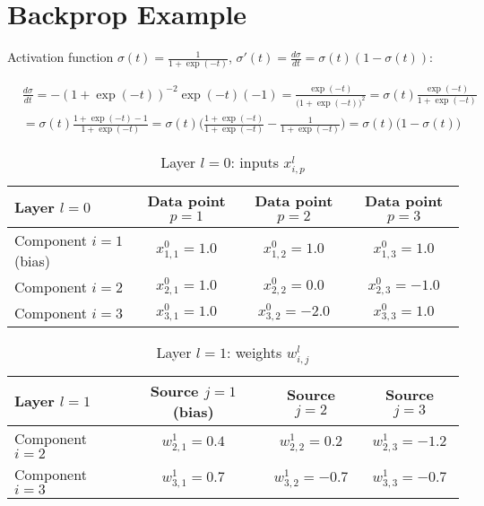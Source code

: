 \section{Backprop Example}
\label{appendix:backprop-example}

Activation function $\sigma(t) = \frac{1}{1 + \exp(-t)}$, $\sigma'(t) = \frac{d \sigma}{dt} = \sigma(t) (1 - \sigma(t))$:

\begin{equation}
\begin{split}
    & \frac{d \sigma}{dt}
        = - (1 + \exp(-t))^{-2} \exp(-t) (-1)
        = \frac{\exp(-t)}{\big( 1 + \exp(-t) \big)^2}
        = \sigma(t) \frac{\exp(-t)}{1 + \exp(-t)} \\
        & = \sigma(t) \frac{1 + \exp(-t) - 1}{1 + \exp(-t)}
        = \sigma(t) \bigg( \frac{1 + \exp(-t)}{1 + \exp(-t)} - \frac{1}{1 + \exp(-t)} \bigg)
        = \sigma(t) \big( 1 - \sigma(t) \big)
\end{split}
\end{equation}

\begin{table}[h!]
    \centering
    \begin{tabular}{|m{3.25cm}|c|c|c|}
        \hline
        \centering Layer $l = 0$ &
        Data point $p = 1$ &
        Data point $p = 2$ &
        Data point $p = 3$ \\
        \hline
        \centering Component $i = 1$ (bias) &
        $x_{1, 1}^0 = 1.0$ &
        $x_{1, 2}^0 = 1.0$ &
        $x_{1, 3}^0 = 1.0$ \\
        \hline
        Component $i = 2$ &
        $x_{2, 1}^0 = 1.0$ &
        $x_{2, 2}^0 = 0.0$ &
        $x_{2, 3}^0 = -1.0$ \\
        \hline
        Component $i = 3$ &
        $x_{3, 1}^0 = 1.0$ &
        $x_{3, 2}^0 = -2.0$ &
        $x_{3, 3}^0 = 1.0$ \\
        \hline
    \end{tabular}
\caption{Layer $l = 0$: inputs $x_{i, p}^l$}
\label{table:layer0-inputs}
\end{table}

\begin{table}[h!]
    \centering
    \begin{tabular}{|m{3.25cm}|c|c|c|}
        \hline
        \centering Layer $l = 1$ &
        \centering Source $j = 1$ (bias) &
        Source $j = 2$ &
        Source $j = 3$ \\
        \hline
        Component $i = 2$ &
        $w_{2, 1}^1 = 0.4$ &
        $w_{2, 2}^1 = 0.2$ &
        $w_{2, 3}^1 = -1.2$ \\
        \hline
        Component $i = 3$ &
        $w_{3, 1}^1 = 0.7$ &
        $w_{3, 2}^1 = -0.7$ &
        $w_{3, 3}^1 = -0.7$ \\
        \hline
    \end{tabular}
\caption{Layer $l = 1$: weights $w_{i, j}^l$}
\label{table:layer1-weights}
\end{table}

